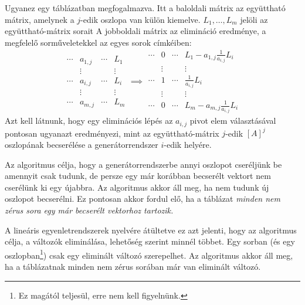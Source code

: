 \documentclass[a4paper, showtrims]{memoir}
\theoremstyle{plain}
\theoremstyle{remark}
\theoremstyle{definition}
\begin{document}
Ugyanez egy táblázatban megfogalmazva.
Itt a baloldali mátrix az együttható mátrix, amelynek
a $j$-edik oszlopa van külön kiemelve.
$L_1,\ldots,L_m$ jelöli az együttható-mátrix sorait
A jobboldali mátrix az elimináció eredménye, a megfelelő sorműveletekkel az egyes sorok
címkéiben:
\[
	\begin{array}{ccc|c}
		\cdots & a_{1,j}         & \cdots & L_1    \\
		       & \vdots          &        & \vdots \\
		\cdots & \boxed{a_{i,j}} & \cdots & L_i    \\
		       & \vdots          &        & \vdots \\
		\cdots & a_{m,j}         & \cdots & L_m
	\end{array}
	\implies
	\begin{array}{ccc|c}
		\cdots & 0      & \cdots & L_1-a_{1,j}\frac{1}{a_{i,j}}L_i \\
		       & \vdots &        & \vdots                          \\
		\cdots & 1      & \cdots & \frac{1}{a_{i,j}}L_i            \\
		       & \vdots &        & \vdots                          \\
		\cdots & 0      & \cdots & L_m-a_{m,j}\frac{1}{a_{i,j}}L_i
	\end{array}
\]
Azt kell látnunk, hogy egy eliminációs lépés az $a_{i,j}$ pivot elem választásával pontosan ugyanazt eredményezi,
mint az együttható-mátrix $j$-edik $\left[ A \right]^j$ oszlopának becserélése a generátorrendszer $i$-edik helyére.

Az algoritmus célja, hogy
a generátorrendszerbe annyi oszlopot cseréljünk be amennyit csak tudunk,
de persze egy már korábban becserélt vektort nem cserélünk ki egy újabbra.
Az algoritmus akkor áll meg, ha nem tudunk új oszlopot becserélni.
Ez pontosan akkor fordul elő,
ha a táblázat \emph{minden nem zérus sora egy már becserélt vektorhoz tartozik.}


A lineáris egyenletrendszerek nyelvére átültetve ez azt jelenti,
hogy az algoritmus célja, a változók eliminálása, lehetőség szerint minnél többet.
Egy sorban (és egy oszlopban\footnote{Ez magától teljesül, erre nem kell figyelnünk.}) csak egy eliminált változó szerepelhet.
Az algoritmus akkor áll meg,
ha a táblázatnak minden nem zérus sorában már van eliminált változó.
\end{document}
